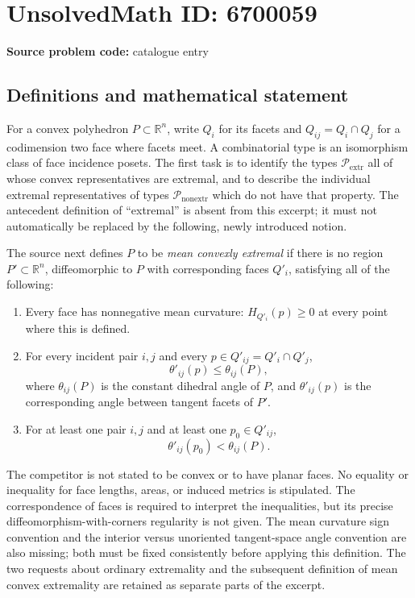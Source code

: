 \documentclass[11pt]{article}
\newcommand{\R}{\mathbb{R}}
\begin{document}
\section*{UnsolvedMath ID: 6700059}
\textbf{Source problem code:} catalogue entry
\subsection{Definitions and mathematical statement}
For a convex polyhedron \(P\subset\R^n\), write \(Q_i\) for its facets and \(Q_{ij}=Q_i\cap Q_j\) for a codimension two face where facets meet. A combinatorial type is an isomorphism class of face incidence posets. The first task is to identify the types \(\mathcal P_{\mathrm{extr}}\) all of whose convex representatives are extremal, and to describe the individual extremal representatives of types \(\mathcal P_{\mathrm{nonextr}}\) which do not have that property. The antecedent definition of ``extremal'' is absent from this excerpt; it must not automatically be replaced by the following, newly introduced notion.

The source next defines \(P\) to be \emph{mean convexly extremal} if there is no region \(P'\subset\R^n\), diffeomorphic to \(P\) with corresponding faces \(Q'_i\), satisfying all of the following:
\begin{enumerate}
\item Every face has nonnegative mean curvature: \(H_{Q'_i}(p)\geq0\) at every point where this is defined.
\item For every incident pair \(i,j\) and every \(p\in Q'_{ij}=Q'_i\cap Q'_j\),
\[
 \theta'_{ij}(p)\leq\theta_{ij}(P),
\]
where \(\theta_{ij}(P)\) is the constant dihedral angle of \(P\), and \(\theta'_{ij}(p)\) is the corresponding angle between tangent facets of \(P'\).
\item For at least one pair \(i,j\) and at least one \(p_0\in Q'_{ij}\),
\[
 \theta'_{ij}(p_0)<\theta_{ij}(P).
\]
\end{enumerate}
The competitor is not stated to be convex or to have planar faces. No equality or inequality for face lengths, areas, or induced metrics is stipulated. The correspondence of faces is required to interpret the inequalities, but its precise diffeomorphism-with-corners regularity is not given. The mean curvature sign convention and the interior versus unoriented tangent-space angle convention are also missing; both must be fixed consistently before applying this definition. The two requests about ordinary extremality and the subsequent definition of mean convex extremality are retained as separate parts of the excerpt.
\end{document}
